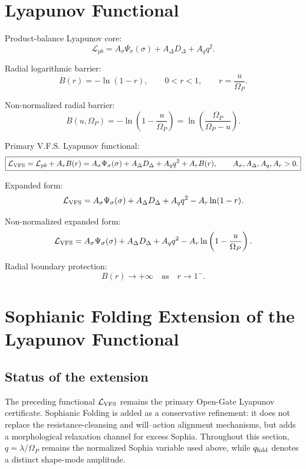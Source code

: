 \documentclass[11pt,a4paper]{article}
\newcommand{\LV}{\mathcal L_{\rm VFS}}
\newcommand{\Om}{\Omega_P}
\theoremstyle{plain}
\theoremstyle{definition}
\theoremstyle{remark}
\begin{document}
\section{Lyapunov Functional}

Product-balance Lyapunov core:
\begin{equation}
  \mathcal L_{pb}=A_\sigma\Psi_\sigma(\sigma)+A_\Delta D_\Delta+A_q q^2.
\end{equation}

Radial logarithmic barrier:
\begin{equation}
  B(r)=-\ln(1-r),
  \qquad
  0<r<1,
  \qquad
  r=\frac{u}{\Om}.
\end{equation}

Non-normalized radial barrier:
\begin{equation}
  B(u,\Om)=-\ln\left(1-\frac{u}{\Om}\right)
  =\ln\left(\frac{\Om}{\Om-u}\right).
\end{equation}

Primary V.F.S. Lyapunov functional:
\begin{equation}
  \boxed{
  \LV=\mathcal L_{pb}+A_rB(r)
  =A_\sigma\Psi_\sigma(\sigma)+A_\Delta D_\Delta+A_q q^2+A_rB(r),
  \qquad
  A_\sigma,A_\Delta,A_q,A_r>0.}
\end{equation}

Expanded form:
\begin{equation}
  \LV=A_\sigma\Psi_\sigma(\sigma)+A_\Delta D_\Delta+A_q q^2
  -A_r\ln(1-r).
\end{equation}

Non-normalized expanded form:
\begin{equation}
  \LV=A_\sigma\Psi_\sigma(\sigma)+A_\Delta D_\Delta+A_q q^2
  -A_r\ln\left(1-\frac{u}{\Om}\right).
\end{equation}

Radial boundary protection:
\begin{equation}
  B(r)\to+\infty\quad\text{as}\quad r\to1^-.
\end{equation}


\section{Sophianic Folding Extension of the Lyapunov Functional}

\subsection{Status of the extension}
The preceding functional $\LV$ remains the primary Open-Gate Lyapunov certificate.
Sophianic Folding is added as a conservative refinement: it does not replace the
resistance-cleansing and will--action alignment mechanisms, but adds a
morphological relaxation channel for excess Sophia. Throughout this section,
$q=\lambda/\Om$ remains the normalized Sophia variable used above, while
$q_{\rm fold}$ denotes a distinct shape-mode amplitude.
\end{document}
